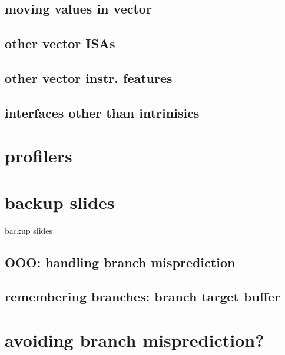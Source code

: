 \subsection{moving values in vector}


\subsection{other vector ISAs}


\subsection{other vector instr. features}


\subsection{interfaces other than intrinisics}


\section{profilers}






\section{backup slides}
\begin{frame}{backup slides}
\end{frame}

\subsection{OOO: handling branch misprediction}


\subsection{remembering branches: branch target buffer}


\section{avoiding branch misprediction?}


